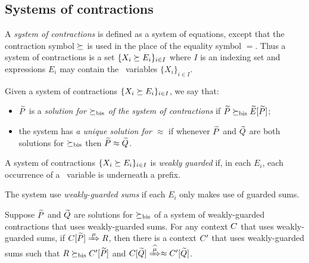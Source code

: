 \subsection{Systems of contractions}
\label{ss:SysContr}

A \emph{system of contractions} is defined as a system of equations,
except that the contraction symbol $\mathrel{\succeq}$ is used in the place of
the equality symbol $=$. Thus a system of contractions is a set 
$\{  X_i \mathrel{\succeq} E_i\}_{i\in I}$
where $I$ is an  indexing set and expressions
$E_i$  may contain the  \behavC\  variables 
$\{  X_i\}_{i\in I}$.

\begin{definition}
\label{d:uniContra}
Given a  system of contractions 
$\{  X_i \mathrel{\succeq} E_i\}_{i\in I}$, 
 we say that:
\begin{itemize}
\item
 $\widetilde P$ is a \emph{solution  for $\mathrel{\succeq_{\rm{bis}}}$ of the 
 system of contractions} 
 if $\widetilde P \mathrel{\succeq_{\rm{bis}}} \widetilde E [\widetilde P]$;
\item 
the system  
has  \emph{a unique 
solution for $\approx$}
if 
whenever 
 $\widetilde P$ and $\widetilde Q$ are both solutions  for  $\mathrel{\succeq_{\rm{bis}}}$
 then $\widetilde P \approx \widetilde Q$.
\end{itemize}
\end{definition}
  


\begin{definition}
\label{d:guarded}
A system of contractions $\{  X_i \mathrel{\succeq} E_i\}_{i\in I}$
 is
\emph{weakly guarded}
if,  in each    $E_i$, each occurrence of
a \behavC\ variable is underneath a prefix.

The system use \emph{weakly-guarded sums} if 
each $E_i$ only makes use of guarded sums.
\end{definition}



 
\begin{lemma}
\label{l:uptocon}
Suppose $\widetilde P$ and $\widetilde Q$ are solutions  for $\mathrel{\succeq_{\rm{bis}}}$
 of a system of weakly-guarded contractions that uses 
weakly-guarded sums.
For any context $C$  that uses 
weakly-guarded sums,
if  $\ct{\til P}\Arr{\mu}  R$,
 then 
there is a context $C'$  that uses 
weakly-guarded sums
such that $R \mathrel{\succeq_{\rm{bis}}} C' [\widetilde P]$ and  $\ct{\til Q} \Arcap{\mu}
 \wb \ctp{\til Q}$.
\end{lemma}

